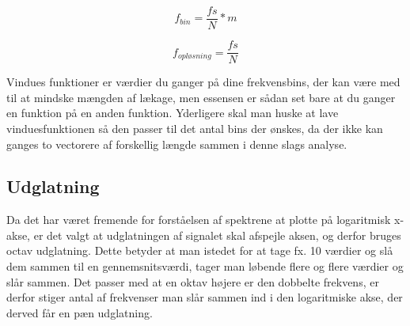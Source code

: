  \begin{equation}\label{eq:bins}
 f_{bin} = \frac{fs}{N}*m 
 \end{equation}

\begin{equation}\label{eq:bins}
f_{opløsning} = \frac{fs}{N} 
\end{equation}

Vindues funktioner er værdier du ganger på dine frekvensbins, der kan være med til at mindske mængden af lækage, men essensen er sådan set bare at du ganger en funktion på en anden funktion. Yderligere skal man huske at lave vinduesfunktionen så den passer til det antal bins der ønskes, da der ikke kan ganges to vectorere af forskellig længde sammen i denne slags analyse.

\subsection{Udglatning}

Da det har været fremende for forståelsen af spektrene at plotte på logaritmisk x-akse, er det valgt at udglatningen af signalet skal afspejle aksen, og derfor bruges octav udglatning. Dette betyder at man istedet for at tage fx. 10 værdier og slå dem sammen til en gennemsnitsværdi, tager man løbende flere og flere værdier og slår sammen. Det passer med at en oktav højere er den dobbelte frekvens, er derfor stiger antal af frekvenser man slår sammen ind i den logaritmiske akse, der derved får en pæn udglatning.



